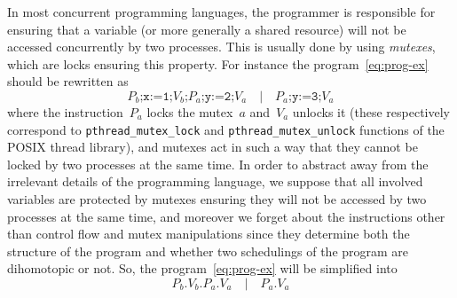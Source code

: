 \documentclass[orivec]{llncs} \usepackage[T1]{fontenc}
\renewcommand{\P}[1]{P_{#1}}
\newcommand{\V}[1]{V_{#1}}
\begin{document}
{In most concurrent programming languages, the programmer is responsible for
ensuring that a variable (or more generally a shared resource) will not be
accessed concurrently by two processes.
This is usually done by using \emph{mutexes}, which are locks ensuring this
property. For instance the program~\eqref{eq:prog-ex} should be rewritten as
\[
\texttt{$\P b$;x:=1;$\V b$;$\P a$;y:=2;$\V a$}\quad|\quad\texttt{$\P a$;y:=3;$\V a$}
\]
where the instruction~$\P a$ locks the mutex~$a$ and~$\V a$ unlocks it (these
respectively correspond to \verb+pthread_mutex_lock+ and
\verb+pthread_mutex_unlock+ functions of the POSIX thread library), and mutexes
act in such a way that they cannot be locked by two processes at the same
time. In order to abstract away from the irrelevant details of the programming
language, we suppose that all involved variables are protected by mutexes
ensuring they will not be accessed by two processes at the same time, and
moreover we forget about the instructions other than control flow and mutex
manipulations since they determine both the structure of the program and whether
two schedulings of the program are dihomotopic or not. So, the
program~\eqref{eq:prog-ex} will be simplified into
\begin{equation}
  \label{eq:pv-ex}
  \P b.\V b.\P a.\V a\quad|\quad\P a.\V a
\end{equation}

}
\end{document}
